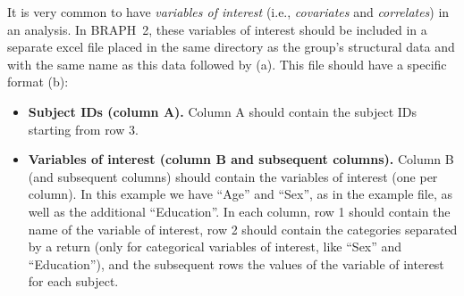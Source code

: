 \documentclass[justified]{tufte-handout}
\begin{document}
It is very common to have \emph{variables of interest} (i.e., \emph{covariates} and \emph{correlates}) in an analysis. In BRAPH~2, these variables of interest should be included in a separate excel file placed in the same directory as the group's structural data and with the same name as this data followed by  (a). This file should have a specific format (b):
\begin{itemize}

\item {\bf Subject IDs (column A).}
Column A should contain the subject IDs starting from row 3.

\item {\bf Variables of interest (column B and subsequent columns).}
Column B (and subsequent columns) should contain the variables of interest (one per column). 
In this example we have ``Age'' and ``Sex'', as in the example file, as well as the additional ``Education''.
In each column, row 1 should contain the name of the variable of interest, row 2 should contain the categories separated by a return (only for categorical variables of interest, like ``Sex'' and ``Education''), and the subsequent rows the values of the variable of interest for each subject.

\end{itemize}	

\end{document}
